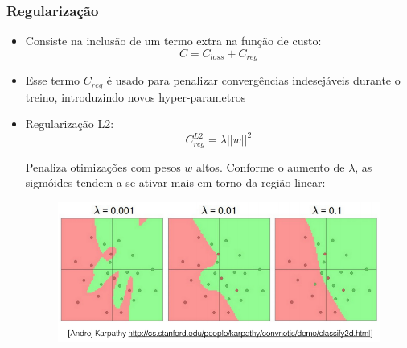 \documentclass[tikz,10pt]{beamer}
\begin{document}
\begin{frame}
	\frametitle{Regularização}
	
	\begin{itemize}
		\item Consiste na inclusão de um termo extra na função de custo:
		$$C = C_{loss} + C_{reg}$$
		
		\item Esse termo $C_{reg}$ é usado para penalizar convergências indesejáveis durante o treino, introduzindo novos hyper-parametros
		
		\item Regularização L2:	    
		$$C^{L2}_{reg} = \lambda ||w||^2$$
		
		Penaliza otimizações com pesos $w$ altos. Conforme o aumento de $\lambda$, as sigmóides tendem a se ativar mais em torno da região linear:
		\begin{figure}
			\centering
			\includegraphics[scale=0.4]{images/regL2.png}
		\end{figure}
		
		
		
		
	\end{itemize}
	
	
\end{frame}
\end{document}
